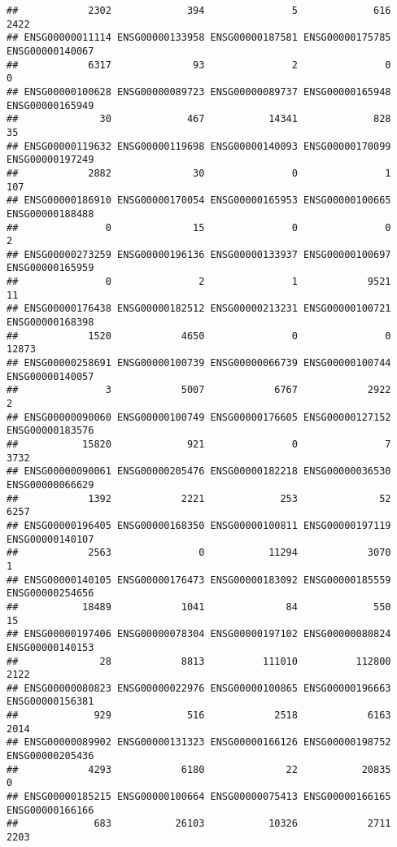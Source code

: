 \documentclass[
]{article}
\begin{document}
\begin{verbatim}
##            2302             394               5             616            2422 
## ENSG00000011114 ENSG00000133958 ENSG00000187581 ENSG00000175785 ENSG00000140067 
##            6317              93               2               0               0 
## ENSG00000100628 ENSG00000089723 ENSG00000089737 ENSG00000165948 ENSG00000165949 
##              30             467           14341             828              35 
## ENSG00000119632 ENSG00000119698 ENSG00000140093 ENSG00000170099 ENSG00000197249 
##            2882              30               0               1             107 
## ENSG00000186910 ENSG00000170054 ENSG00000165953 ENSG00000100665 ENSG00000188488 
##               0              15               0               0               2 
## ENSG00000273259 ENSG00000196136 ENSG00000133937 ENSG00000100697 ENSG00000165959 
##               0               2               1            9521              11 
## ENSG00000176438 ENSG00000182512 ENSG00000213231 ENSG00000100721 ENSG00000168398 
##            1520            4650               0               0           12873 
## ENSG00000258691 ENSG00000100739 ENSG00000066739 ENSG00000100744 ENSG00000140057 
##               3            5007            6767            2922               2 
## ENSG00000090060 ENSG00000100749 ENSG00000176605 ENSG00000127152 ENSG00000183576 
##           15820             921               0               7            3732 
## ENSG00000090061 ENSG00000205476 ENSG00000182218 ENSG00000036530 ENSG00000066629 
##            1392            2221             253              52            6257 
## ENSG00000196405 ENSG00000168350 ENSG00000100811 ENSG00000197119 ENSG00000140107 
##            2563               0           11294            3070               1 
## ENSG00000140105 ENSG00000176473 ENSG00000183092 ENSG00000185559 ENSG00000254656 
##           18489            1041              84             550              15 
## ENSG00000197406 ENSG00000078304 ENSG00000197102 ENSG00000080824 ENSG00000140153 
##              28            8813          111010          112800            2122 
## ENSG00000080823 ENSG00000022976 ENSG00000100865 ENSG00000196663 ENSG00000156381 
##             929             516            2518            6163            2014 
## ENSG00000089902 ENSG00000131323 ENSG00000166126 ENSG00000198752 ENSG00000205436 
##            4293            6180              22           20835               0 
## ENSG00000185215 ENSG00000100664 ENSG00000075413 ENSG00000166165 ENSG00000166166 
##             683           26103           10326            2711            2203 

\end{verbatim}
\end{document}

